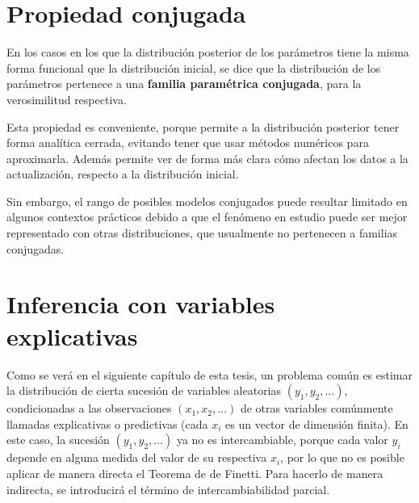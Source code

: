 \section{Propiedad conjugada}

En los casos en los que la distribuci\'on posterior de los par\'ametros tiene la misma forma funcional que la distribuci\'on inicial, se dice que la distribuci\'on de los par\'ametros pertenece a una \textbf{familia param\'etrica conjugada}, para la verosimilitud respectiva.

Esta propiedad es conveniente, porque permite a la distribuci\'on posterior tener forma anal\'itica cerrada, evitando tener que usar m\'etodos num\'ericos para aproximarla. Adem\'as permite ver de forma m\'as clara c\'omo afectan los datos a la actualizaci\'on, respecto a la distribuci\'on inicial.

Sin embargo, el rango de posibles modelos conjugados puede resultar limitado en algunos contextos pr\'acticos debido a que el fen\'omeno en estudio puede ser mejor representado con otras distribuciones, que usualmente no pertenecen a familias conjugadas.

\section[Inferencia con variables explicativas]{Inferencia con variables explicativas\raisebox{.3\baselineskip}{\normalsize\footnotemark}}

Como se ver\'a en el siguiente cap\'itulo de esta tesis, un problema com\'un es estimar la distribuci\'on de cierta sucesi\'on de variables aleatorias $(y_1,y_2,\ldots)$, condicionadas a las observaciones $(x_1,x_2,\ldots)$ de otras variables com\'unmente llamadas explicativas o predictivas (cada $x_i$ es un vector de dimensi\'on finita). En este caso, la sucesi\'on $(y_1,y_2,\ldots)$ ya no es intercambiable, porque cada valor $y_i$ depende en alguna medida del valor de su respectiva $x_i$, por lo que no es posible aplicar de manera directa el Teorema de de Finetti. Para hacerlo de manera indirecta, se introducir\'a el t\'ermino de intercambiabilidad parcial.

